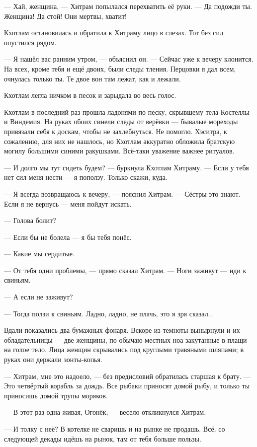 --- Хай, женщина, --- Хитрам попылался перехватить её руки.
--- Да подожди ты.
Женщина!
Да стой!
Они мертвы, хватит!

Кхотлам остановилась и обратила к Хитраму лицо в слезах.
Тот без сил опустился рядом.

--- Я нашёл вас ранним утром, --- объяснил он.
--- Сейчас уже к вечеру клонится.
На всех, кроме тебя и ещё двоих, были следы тления.
Перцовки я дал всем, очнулась только ты.
Те двое вон там лежат, как и лежали.

Кхотлам легла ничком в песок и зарыдала во весь голос.

\asterism

Кхотлам в последний раз прошла ладонями по песку, скрывшему тела Костеллы и Виндемия.
На руках обоих синели следы от верёвки --- бывалые мореходы привязали себя к доскам, чтобы не захлебнуться.
Не помогло.
Хэситра, к сожалению, для них не нашлось, но Кхотлам аккуратно обложила братскую могилу большими синими ракушками.
Всё-таки уважение важнее ритуалов.

--- И долго мы тут сидеть будем? --- буркнула Кхотлам Хитраму.
--- Если у тебя нет сил меня нести --- я поползу.
Только скажи, куда.

--- Я всегда возвращаюсь к вечеру, --- пояснил Хитрам.
--- Сёстры это знают.
Если я не вернусь --- меня пойдут искать.

--- Голова болит?

--- Если бы не болела --- я бы тебя понёс.

--- Какие мы сердитые.

--- От тебя одни проблемы, --- прямо сказал Хитрам.
--- Ноги заживут --- иди к свиньям.

--- А если не заживут?

--- Тогда ползи к свиньям.
Ладно, ладно, не плачь, это я зря сказал...

Вдали показались два бумажных фонаря.
Вскоре из темноты вынырнули и их обладательницы --- две женщины, по обычаю местных ноа закутанные в плащи на голое тело.
Лица женщин скрывались под круглыми травяными шляпами;
в руках они держали зонты-копья.

--- Хитрам, мне это надоело, --- без предисловий обратилась старшая к брату.
--- Это четвёртый корабль за дождь.
Все рыбаки приносят домой рыбу, и только ты приносишь домой трупы моряков.

--- В этот раз одна живая, Огонёк, --- весело откликнулся Хитрам.

--- И толку с неё?
В котелке не сваришь и на рынке не продашь.
Всё, со следующей декады идёшь на рынок, там от тебя больше пользы.

